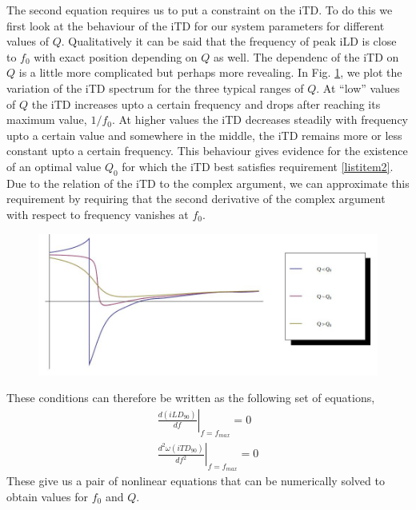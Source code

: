 The second equation requires us to put a constraint on the iTD. To do this we first look at the behaviour of the iTD for our system parameters for
different values of $Q$.
Qualitatively it can be said that the frequency of peak iLD is close to $f_0$ with exact position depending on $Q$ as well.
The dependenc of the iTD on $Q$ is a little more complicated but perhaps more revealing. In Fig. \ref{itdQdependence}, we plot the variation of the 
iTD spectrum for the three typical ranges of $Q$. At ``low'' values of $Q$ the iTD increases upto a certain frequency and drops
 after reaching its maximum value, $1/f_0$. At higher values the iTD decreases steadily with frequency upto a certain value and
 somewhere in the middle, the iTD remains more or less constant upto a certain frequency. This behaviour gives evidence for the existence of an optimal value $Q_0$ 
for which the iTD  best satisfies requirement \ref{listitem2}. Due to the relation of the iTD to the complex argument, we can approximate this requirement by requiring that the second derivative of
the complex argument with respect to frequency vanishes at $f_0$.

\begin{figure}[ht!]
\centering
  \includegraphics[width=.7\linewidth]{Diagrams/Plots/paramtest/allthree.jpeg}
  \caption[Dependence of iTD spectrum on Quality Factor]{}
  \label{itdQdependence}
\end{figure}
\noindent These conditions can therefore be written as the following set of equations,
\begin{align}
 \left.\frac{d (iLD_{90})}{df}\right|_{f=f_{max}}=0\\
 \left.\frac{d^2 \omega (iTD_{90})}{df^2}\right|_{f=f_{max}}=0
\end{align}
These give us a pair of nonlinear equations that can be numerically solved to obtain values for $f_0$ and $Q$.

